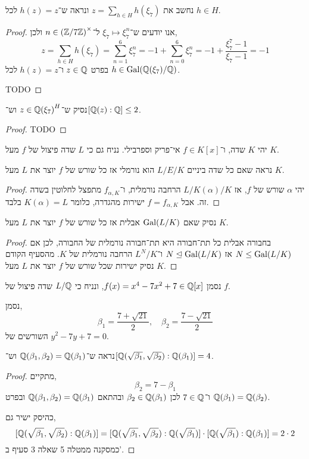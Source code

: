 \subquestion{}
נחשב את $z = \sum_{h \in H} h(\xi_7)$ ונראה ש־$h(z) = z$ לכל $h \in H$.
\begin{proof}
	אנו יודעים ש־$\xi_7 \mapsto \xi_7^n$ ל־$n \in {(\mathbb{Z}/ 7\mathbb{Z})}^\times$ ולכן,
	\[
		z
		= \sum_{h \in H} h(\xi_7)
		= \sum_{n = 1}^6 \xi_7^n
		= -1 + \sum_{n = 0}^6 \xi_7^n
		= -1 + \frac{\xi_7^7 - 1}{\xi_7 - 1}
		= -1
	\]
	בפרט $z \in \mathbb{Q}$ ו־$h(z) = z$ לכל $h \in \operatorname{Gal}(\mathbb{Q}(\xi_7) / \mathbb{Q})$.

	TODO
\end{proof}

\subquestion{}
נסיק ש־$z \in {\mathbb{Q}(\xi_7)}^H$ וש־$[\mathbb{Q}(z) : \mathbb{Q}] \le 2$.
\begin{proof}
	TODO
\end{proof}

\question{}
יהי $K$ שדה, ו־$f \in K[x]$ אי־פריק וספרבילי.
נניח גם כי $L$ שדה פיצול של $f$ מעל $K$.

\subquestion{}
נראה שאם כל שדה ביניים $L / E / K$ הוא נורמלי אז כל שורש של $f$ יוצר את $L$ מעל $K$.
\begin{proof}
	יהי $\alpha$ שורש של $f$, אז $L / K(\alpha) / K$ הרחבה נורמלית, ו־$f_{\alpha, K}$ מתפצל לחלוטין בשדה זה.
	אבל $f = f_{\alpha, K}$ ישירות מהגדרה, כלומר $K(\alpha) = L$ בלבד.
\end{proof}

\subquestion{}
נסיק שאם $\operatorname{Gal}(L / K)$ אבלית אז כל שורש של $f$ יוצר את $L$ מעל $K$.
\begin{proof}
	בחבורה אבלית כל תת־חבורה היא תת־חבורה נורמלית של החבורה, לכן אם $N \le \operatorname{Gal}(L / K)$ אז $N \trianglelefteq \operatorname{Gal}(L / K)$ ו־$L^N / K$ הרחבה נורמלית של $K$.
	מהסעיף הקודם נסיק ישירות שכל שורש של $f$ יוצר את $L$ מעל $K$.
\end{proof}

\question{}
נסמן $f(x) = x^4 - 7x^2 + 7 \in \mathbb{Q}[x]$, ונניח כי $L / \mathbb{Q}$ שדה פיצול של $f$.

\subquestion{}
נסמן,
\[
	\beta_1
	= \frac{7 + \sqrt{21}}{2},
	\quad
	\beta_2
	= \frac{7 - \sqrt{21}}{2}
\]
השורשים של $y^2 - 7y + 7 = 0$.

\subquestion{}
נראה ש־$\mathbb{Q}(\beta_1, \beta_2) = \mathbb{Q}(\beta_1)$ וש־$[\mathbb{Q}(\sqrt{\beta_1}, \sqrt{\beta_2}) : \mathbb{Q}(\beta_1)] = 4$.
\begin{proof}
	מתקיים,
	\[
		\beta_2
		= 7 - \beta_1
	\]
	ו־$7 \in \mathbb{Q}$ לכן $\beta_2 \in \mathbb{Q}(\beta_1)$ ובהתאם $\mathbb{Q}(\beta_1, \beta_2) = \mathbb{Q}(\beta_1)$ ובפרט $\mathbb{Q}(\beta_1) = \mathbb{Q}(\beta_2)$.

	כהיסק ישיר גם,
	\[
		[\mathbb{Q}(\sqrt{\beta_1}, \sqrt{\beta_2}) : \mathbb{Q}(\beta_1)]
		= [\mathbb{Q}(\sqrt{\beta_1}, \sqrt{\beta_2}) : \mathbb{Q}(\sqrt{\beta_1})]
		\cdot [\mathbb{Q}(\sqrt{\beta_1}) : \mathbb{Q}(\beta_1)]
		= 2 \cdot 2
	\]
	כמסקנה ממטלה 5 שאלה 3 סעיף ב'.
\end{proof}

